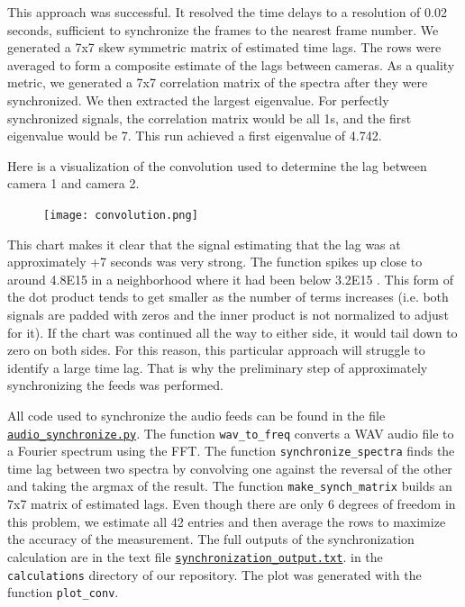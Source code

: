 \documentclass{article}
\begin{document}
This approach was successful.  It resolved the time delays to a resolution of 0.02 seconds,
sufficient to synchronize the frames to the nearest frame number.
We generated a 7x7 skew symmetric matrix of estimated time lags.
The rows were averaged to form a composite estimate of the lags between cameras.
As a quality metric, we generated a 7x7 correlation matrix of the spectra after
they were synchronized.  We then extracted the largest eigenvalue.
For perfectly synchronized signals, the correlation matrix would be all 1s,
and the first eigenvalue would be 7.  This run achieved a first eigenvalue of 4.742.

Here is a visualization of the convolution used to determine the lag between camera 1 and camera 2.
\begin{figure}[H]
\center
\texttt{[image: convolution.png]}
\end{figure}

This chart makes it clear that the signal estimating that the lag was at approximately 
+7 seconds was very strong.  The function spikes up close to around 4.8E15 in a 
neighborhood where it had been below 3.2E15 .  
This form of the dot product tends to get smaller as the number of terms increases
(i.e. both signals are padded with zeros and the inner product is not normalized to adjust for it). 
If the chart was continued all the way to either side, it would tail down to zero 
on both sides.  For this reason, this particular approach will struggle to identify a large time lag.
That is why the preliminary step of approximately synchronizing the feeds was performed.

All code used to synchronize the audio feeds can be found in the file 
\href{https://github.com/Harvard-AM-205-Basketball/Basketball/blob/master/src/audio_synchronize.py}
{\texttt{audio\_synchronize.py}}.
The function \texttt{wav\_to\_freq} converts a WAV audio file to a Fourier spectrum using the FFT.
The function \texttt{synchronize\_spectra} finds the time lag between two spectra by convolving one
against the reversal of the other and taking the argmax of the result.
The function \texttt{make\_synch\_matrix} builds an 7x7 matrix of estimated lags.
Even though there are only 6 degrees of freedom in this problem, 
we estimate all 42 entries and then average the rows to maximize the accuracy of the measurement.
The full outputs of the synchronization calculation are in the text file 
\href{https://github.com/Harvard-AM-205-Basketball/Basketball/blob/master/calculations/synchronization_output.txt}
{\texttt{synchronization\_output.txt}}.
in the \texttt{calculations} directory of our repository.
The plot was generated with the function \texttt{plot\_conv}.
\end{document}
